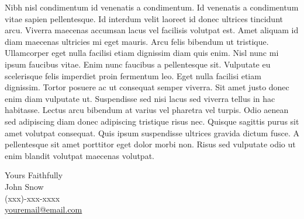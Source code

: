 \documentclass[11pt,a4]{article}
\begin{document}
Nibh nisl condimentum id venenatis a condimentum. Id venenatis a condimentum vitae sapien pellentesque. Id interdum velit laoreet id donec ultrices tincidunt arcu. Viverra maecenas accumsan lacus vel facilisis volutpat est. Amet aliquam id diam maecenas ultricies mi eget mauris. Arcu felis bibendum ut tristique. Ullamcorper eget nulla facilisi etiam dignissim diam quis enim. Nisl nunc mi ipsum faucibus vitae. Enim nunc faucibus a pellentesque sit. Vulputate eu scelerisque felis imperdiet proin fermentum leo. Eget nulla facilisi etiam dignissim. Tortor posuere ac ut consequat semper viverra. Sit amet justo donec enim diam vulputate ut. Suspendisse sed nisi lacus sed viverra tellus in hac habitasse. Lectus arcu bibendum at varius vel pharetra vel turpis. Odio aenean sed adipiscing diam donec adipiscing tristique risus nec. Quisque sagittis purus sit amet volutpat consequat. Quis ipsum suspendisse ultrices gravida dictum fusce. A pellentesque sit amet porttitor eget dolor morbi non. Risus sed vulputate odio ut enim blandit volutpat maecenas volutpat. \par


\vspace{0.5cm}
\raggedright
Yours Faithfully \\ John Snow \\ (xxx)-xxx-xxxx \\ \href{mailto:youremail@email.com}{youremail@email.com}
\end{document}
